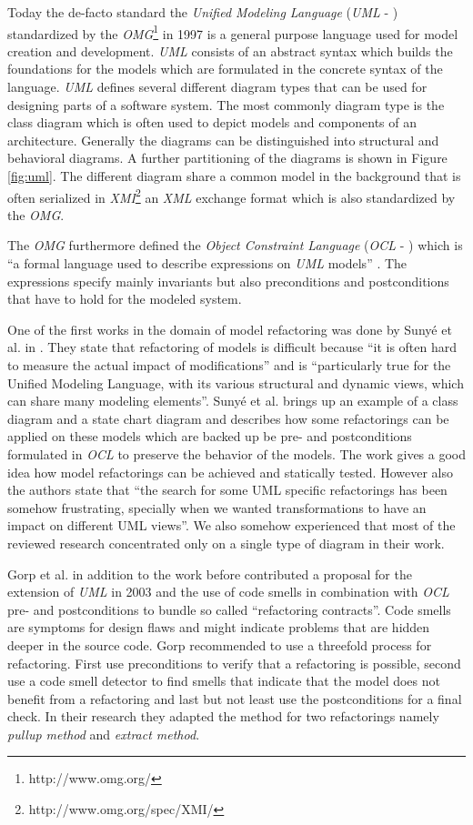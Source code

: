 \documentclass{llncs}
\begin{document}
Today the de-facto standard the \textit{Unified Modeling Language} (\textit{UML} - \cite{man:UML}) standardized by the \textit{OMG}\footnote{http://www.omg.org/} in 1997 is a general purpose language used for model creation and development. \textit{UML} consists of an abstract syntax which builds the foundations for the models which are formulated in the concrete syntax of the language. \textit{UML} defines several different diagram types that can be used for designing parts of a software system. The most commonly diagram type is the class diagram which is often used to depict models and components of an architecture. Generally the diagrams can be distinguished into structural and behavioral diagrams. A further partitioning of the diagrams is shown in Figure \ref{fig:uml}. The different diagram share a common model in the background that is often serialized in \textit{XMI}\footnote{http://www.omg.org/spec/XMI/} an \textit{XML} exchange format which is also standardized by the \textit{OMG}. 

The \textit{OMG} furthermore defined the \textit{Object Constraint Language} (\textit{OCL} - \cite{man:OCL}) which is ``a formal language used to describe expressions on \textit{UML} models'' \cite{man:OCL}. The expressions specify mainly invariants but also preconditions and postconditions that have to hold for the modeled system.

One of the first works in the domain of model refactoring was done by Suny{\'e} et al. in \cite{DBLP:conf/uml/SunyePTJ01}. They state that refactoring of models is difficult because ``it is often hard to measure the actual impact of modifications'' and is ``particularly true for the Unified Modeling Language, with its various structural and dynamic views, which can share many modeling elements''. Suny{\'e} et al. brings up an example of a class diagram and a state chart diagram and describes how some refactorings can be applied on these models which are backed up be pre- and postconditions formulated in \textit{OCL} to preserve the behavior of the models. The work gives a good idea how model refactorings can be achieved and statically tested. However also the authors state that ``the search for some UML specific refactorings has been somehow frustrating, specially when we wanted transformations to have an impact on different UML views''. We also somehow experienced that most of the reviewed research 
concentrated only on a single type of diagram in their work.

Gorp et al. \cite{gorp03} in addition to the work before contributed a proposal for the extension of \textit{UML} in 2003 and the use of code smells in combination with \textit{OCL} pre- and postconditions to bundle so called ``refactoring contracts''. Code smells are symptoms for design flaws and might indicate problems that are hidden deeper in the source code. Gorp recommended to use a threefold process for refactoring. First use preconditions to verify that a refactoring is possible, second use a code smell detector to find smells that indicate that the model does not benefit from a refactoring and last but not least use the postconditions for a final check. In their research they adapted the method for two refactorings namely \textit{pullup method} and \textit{extract method}.
\end{document}
